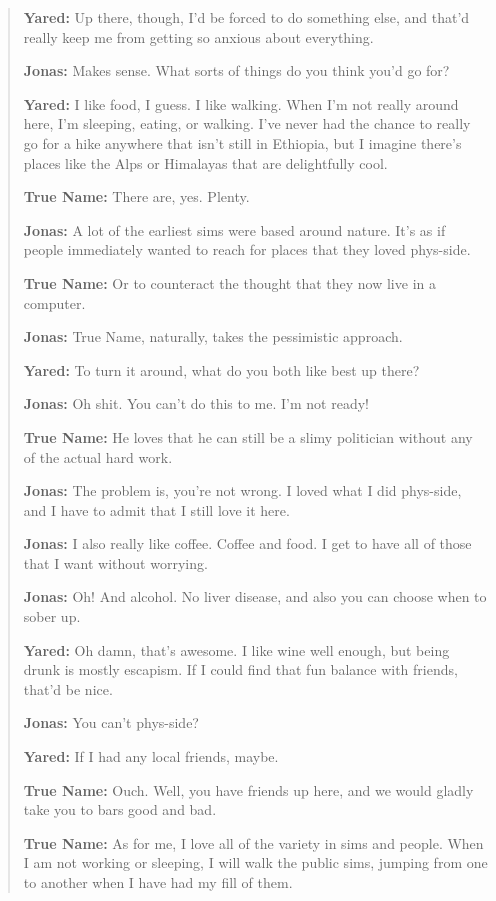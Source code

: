 \begin{quote}
\textbf{Yared:} Up there, though, I'd be forced to do something else, and that'd really keep me from getting so anxious about everything.

\textbf{Jonas:} Makes sense. What sorts of things do you think you'd go for?

\textbf{Yared:} I like food, I guess. I like walking. When I'm not really around here, I'm sleeping, eating, or walking. I've never had the chance to really go for a hike anywhere that isn't still in Ethiopia, but I imagine there's places like the Alps or Himalayas that are delightfully cool.

\textbf{True Name:} There are, yes. Plenty.

\textbf{Jonas:} A lot of the earliest sims were based around nature. It's as if people immediately wanted to reach for places that they loved phys-side.

\textbf{True Name:} Or to counteract the thought that they now live in a computer.

\textbf{Jonas:} True Name, naturally, takes the pessimistic approach.

\textbf{Yared:} To turn it around, what do you both like best up there?

\textbf{Jonas:} Oh shit. You can't do this to me. I'm not ready!

\textbf{True Name:} He loves that he can still be a slimy politician without any of the actual hard work.

\textbf{Jonas:} The problem is, you're not wrong. I loved what I did phys-side, and I have to admit that I still love it here.

\textbf{Jonas:} I also really like coffee. Coffee and food. I get to have all of those that I want without worrying.

\textbf{Jonas:} Oh! And alcohol. No liver disease, and also you can choose when to sober up.

\textbf{Yared:} Oh damn, that's awesome. I like wine well enough, but being drunk is mostly escapism. If I could find that fun balance with friends, that'd be nice.

\textbf{Jonas:} You can't phys-side?

\textbf{Yared:} If I had any local friends, maybe.

\textbf{True Name:} Ouch. Well, you have friends up here, and we would gladly take you to bars good and bad.

\textbf{True Name:} As for me, I love all of the variety in sims and people. When I am not working or sleeping, I will walk the public sims, jumping from one to another when I have had my fill of them.


\end{quote}
